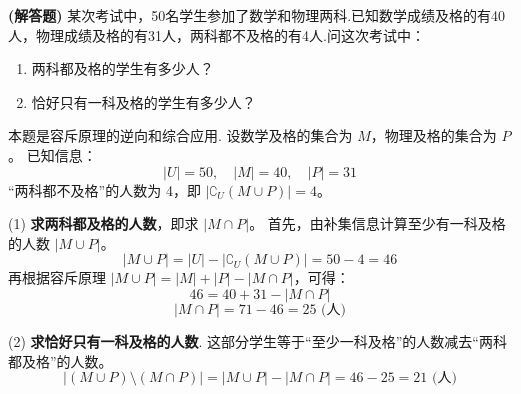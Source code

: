\begin{prob}[topic={容斥原理的逆向应用}, score=12]
\textbf{(解答题)} 某次考试中，50名学生参加了数学和物理两科.已知数学成绩及格的有40人，物理成绩及格的有31人，两科都不及格的有4人.问这次考试中：
\begin{enumerate}
	\item 两科都及格的学生有多少人？
	\item 恰好只有一科及格的学生有多少人？
\end{enumerate}
\end{prob}
\begin{prob-sol}
本题是容斥原理的逆向和综合应用.
设数学及格的集合为 $M$，物理及格的集合为 $P$。
已知信息：
\[ \lvert U\rvert=50, \quad \lvert M\rvert=40, \quad \lvert P\rvert=31 \]
``两科都不及格''的人数为 4，即 $\lvert\complement_U(M \cup P)\rvert=4$。

(1) \textbf{求两科都及格的人数}，即求 $\lvert M \cap P\rvert$。
首先，由补集信息计算至少有一科及格的人数 $\lvert M \cup P\rvert$。
\[ \lvert M \cup P\rvert = \lvert U\rvert - \lvert\complement_U(M \cup P)\rvert = 50 - 4 = 46 \]
再根据容斥原理 $\lvert M \cup P\rvert = \lvert M\rvert + \lvert P\rvert - \lvert M \cap P\rvert$，可得：
\[ 46 = 40 + 31 - \lvert M \cap P\rvert \]
\[ \lvert M \cap P\rvert = 71 - 46 = 25 \text{ (人)} \]

(2) \textbf{求恰好只有一科及格的人数}.
这部分学生等于``至少一科及格''的人数减去``两科都及格''的人数。
\[ \lvert(M \cup P) \setminus (M \cap P)\rvert = \lvert M \cup P\rvert - \lvert M \cap P\rvert = 46 - 25 = 21 \text{ (人)} \]
\end{prob-sol}
